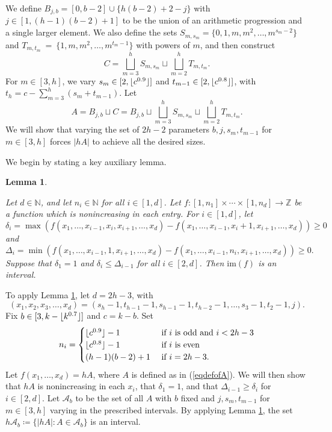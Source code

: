 \documentclass{daj}
\newtheorem{lemma}[theorem]{Lemma}
\theoremstyle{definition}
\theoremstyle{remark}
\numberwithin{equation}{section}
\numberwithin{theorem}{section}
\newcommand{\N}{\mathbb{N}}
\newcommand{\Z}{\mathbb{Z}}
\newcommand{\cala}{\mathcal{A}}
\DeclarePairedDelimiter{\floor}{\lfloor}{\rfloor}
\begin{document}
We define $B_{j,b} = [0,b-2] \cup \{h(b-2)+2-j\}$ with $j \in [1,(h-1)(b-2)+1]$ to be the union of an arithmetic progression and a single larger element. We also define the sets $S_{m,s_m} = \{0,1,m, m^2,\ldots,m^{s_m-2}\}$ and $T_{m,t_m}~=~\{1,m,m^2,\ldots,m^{t_m-1}\}$ with powers of $m$, and then construct \[C = \bigsqcup_{m=3}^h S_{m,s_m} \sqcup \bigsqcup_{m=2}^h T_{m,t_m}.\] For $m \in [3,h]$, we vary $s_m \in [2,\floor{c^{0.9}}]$ and $t_{m-1}\in [2,\floor{c^{0.8}}]$, with $t_h = c - \sum_{m=3}^h(s_m+t_{m-1})$. Let \begin{equation}\label{eqdefofA}
    A = B_{j,b} \sqcup C = B_{j,b}\sqcup\bigsqcup_{m=3}^h S_{m,s_m} \sqcup \bigsqcup_{m=2}^h T_{m,t_m}.
\end{equation} We will show that varying the set of $2h-2$ parameters $b, j, s_m, t_{m-1}$ for $m \in [3,h]$ forces $|hA|$ to achieve all the desired sizes. 

We begin by stating a key auxiliary lemma.

\begin{lemma}\label{lemmahypercubeIVT}

    Let $d\in \N$, and let $n_i \in \N$ for all $i \in [1,d]$. Let $f:[1,n_1]\times \cdots \times [1,n_d] \to \Z$ be a function which is nonincreasing in each entry. For $i \in [1,d]$, let \[\delta_i = \max (f(x_1,\ldots,x_{i-1},x_i,x_{i+1},\ldots,x_d) - f(x_1,\ldots,x_{i-1},x_i+1,x_{i+1},\ldots,x_d)) \geq 0\] and \[\Delta_i = \min (f(x_1,\ldots,x_{i-1},1,x_{i+1},\ldots,x_d) - f(x_1,\ldots,x_{i-1},n_i,x_{i+1},\ldots,x_d)) \geq 0.\] Suppose that $\delta_1 = 1$ and $\delta_{i}\leq \Delta_{i-1}$ for all $i \in [2,d]$. Then $\mathrm{im}(f)$ is an interval.
\end{lemma}
To apply Lemma \ref{lemmahypercubeIVT}, let $d = 2h-3$, with \begin{equation}\label{eqxi}(x_1,x_2,x_3,\ldots,x_{d}) = (s_h-1,t_{h-1}-1,s_{h-1}-1,t_{h-2}-1,\ldots,s_{3}-1,t_2-1,j).\end{equation} Fix $b \in [3,k-\floor{k^{0.7}}]$ and $c = k-b$. Set \begin{equation}\label{eqvalni}
n_i = \begin{cases}
    \floor{c^{0.9}}-1 &\text{ if } i \text{ is odd and } i <2h-3 \\
    \floor{c^{0.8}}-1 &\text{ if } i \text{ is even} \\
    (h-1)(b-2)+1 &\text{ if } i = 2h-3.
\end{cases}\end{equation} Let $f(x_1,\ldots,x_{d}) = hA$, where $A$ is defined as in (\ref{eqdefofA}). We will then show that $hA$ is nonincreasing in each $x_i$, that $\delta_1 = 1$, and that $\Delta_{i-1} \geq \delta_i$ for $i \in [2,d]$. Let $\cala_b$ to be the set of all $A$ with $b$ fixed and $j, s_m, t_{m-1}$ for $m \in [3,h]$ varying in the prescribed intervals. By applying Lemma \ref{lemmahypercubeIVT}, the set $h\cala_b \coloneq  \{|hA|: A \in \cala_b\}$ is an interval. 
\end{document}
